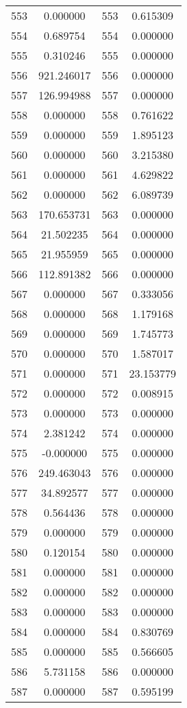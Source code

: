 \documentclass[12pt]{article}
\begin{document}
\begin{longtable}{@{}cccc@{}}
553 & 0.000000 & 553 & 0.615309 \\
554 & 0.689754 & 554 & 0.000000 \\
555 & 0.310246 & 555 & 0.000000 \\
556 & 921.246017 & 556 & 0.000000 \\
557 & 126.994988 & 557 & 0.000000 \\
558 & 0.000000 & 558 & 0.761622 \\
559 & 0.000000 & 559 & 1.895123 \\
560 & 0.000000 & 560 & 3.215380 \\
561 & 0.000000 & 561 & 4.629822 \\
562 & 0.000000 & 562 & 6.089739 \\
563 & 170.653731 & 563 & 0.000000 \\
564 & 21.502235 & 564 & 0.000000 \\
565 & 21.955959 & 565 & 0.000000 \\
566 & 112.891382 & 566 & 0.000000 \\
567 & 0.000000 & 567 & 0.333056 \\
568 & 0.000000 & 568 & 1.179168 \\
569 & 0.000000 & 569 & 1.745773 \\
570 & 0.000000 & 570 & 1.587017 \\
571 & 0.000000 & 571 & 23.153779 \\
572 & 0.000000 & 572 & 0.008915 \\
573 & 0.000000 & 573 & 0.000000 \\
574 & 2.381242 & 574 & 0.000000 \\
575 & -0.000000 & 575 & 0.000000 \\
576 & 249.463043 & 576 & 0.000000 \\
577 & 34.892577 & 577 & 0.000000 \\
578 & 0.564436 & 578 & 0.000000 \\
579 & 0.000000 & 579 & 0.000000 \\
580 & 0.120154 & 580 & 0.000000 \\
581 & 0.000000 & 581 & 0.000000 \\
582 & 0.000000 & 582 & 0.000000 \\
583 & 0.000000 & 583 & 0.000000 \\
584 & 0.000000 & 584 & 0.830769 \\
585 & 0.000000 & 585 & 0.566605 \\
586 & 5.731158 & 586 & 0.000000 \\
587 & 0.000000 & 587 & 0.595199 \\

\end{longtable}
\end{document}
